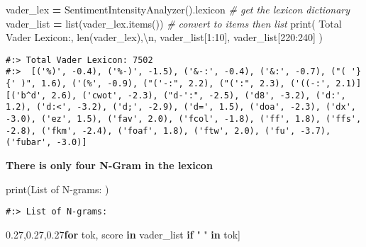 \documentclass[
]{book}
\newenvironment{Shaded}{\begin{snugshade}}{\end{snugshade}}
\newcommand{\BuiltInTok}[1]{#1}
\newcommand{\CharTok}[1]{\textcolor[rgb]{0.5,0.5,0.5}{#1}}
\newcommand{\CommentTok}[1]{\textcolor[rgb]{0.37,0.37,0.37}{\textit{#1}}}
\newcommand{\ControlFlowTok}[1]{\textcolor[rgb]{0.27,0.27,0.27}{\textbf{#1}}}
\newcommand{\DecValTok}[1]{\textcolor[rgb]{0.06,0.06,0.06}{#1}}
\newcommand{\KeywordTok}[1]{\textcolor[rgb]{0.27,0.27,0.27}{\textbf{#1}}}
\newcommand{\NormalTok}[1]{#1}
\newcommand{\OperatorTok}[1]{\textcolor[rgb]{0.43,0.43,0.43}{\textbf{#1}}}
\newcommand{\StringTok}[1]{\textcolor[rgb]{0.5,0.5,0.5}{#1}}
\begin{document}
\begin{Shaded}
\begin{Highlighting}[]
\NormalTok{vader\_lex  }\OperatorTok{=}\NormalTok{ SentimentIntensityAnalyzer().lexicon  }\CommentTok{\# get the lexicon dictionary}
\NormalTok{vader\_list }\OperatorTok{=} \BuiltInTok{list}\NormalTok{(vader\_lex.items())               }\CommentTok{\# convert to items then list}
\BuiltInTok{print}\NormalTok{( }\StringTok{\textquotesingle{}Total Vader Lexicon:\textquotesingle{}}\NormalTok{, }\BuiltInTok{len}\NormalTok{(vader\_lex),}\StringTok{\textquotesingle{}}\CharTok{\textbackslash{}n}\StringTok{\textquotesingle{}}\NormalTok{,}
\NormalTok{        vader\_list[}\DecValTok{1}\NormalTok{:}\DecValTok{10}\NormalTok{], vader\_list[}\DecValTok{220}\NormalTok{:}\DecValTok{240}\NormalTok{] )}
\end{Highlighting}
\end{Shaded}

\begin{verbatim}
#:> Total Vader Lexicon: 7502 
#:>  [('%)', -0.4), ('%-)', -1.5), ('&-:', -0.4), ('&:', -0.7), ("( '}{' )", 1.6), ('(%', -0.9), ("('-:", 2.2), ("(':", 2.3), ('((-:', 2.1)] [('b^d', 2.6), ('cwot', -2.3), ("d-':", -2.5), ('d8', -3.2), ('d:', 1.2), ('d:<', -3.2), ('d;', -2.9), ('d=', 1.5), ('doa', -2.3), ('dx', -3.0), ('ez', 1.5), ('fav', 2.0), ('fcol', -1.8), ('ff', 1.8), ('ffs', -2.8), ('fkm', -2.4), ('foaf', 1.8), ('ftw', 2.0), ('fu', -3.7), ('fubar', -3.0)]
\end{verbatim}

\textbf{There is only four N-Gram in the lexicon}

\begin{Shaded}
\begin{Highlighting}[]
\BuiltInTok{print}\NormalTok{(}\StringTok{\textquotesingle{}List of N{-}grams: \textquotesingle{}}\NormalTok{)}
\end{Highlighting}
\end{Shaded}

\begin{verbatim}
#:> List of N-grams:
\end{verbatim}

\begin{Shaded}
\begin{Highlighting}[]
\NormalTok{[ (tok,score) }\ControlFlowTok{for}\NormalTok{ tok, score }\KeywordTok{in}\NormalTok{ vader\_list }\ControlFlowTok{if} \StringTok{" "} \KeywordTok{in}\NormalTok{ tok]}
\end{Highlighting}
\end{Shaded}
\end{document}
